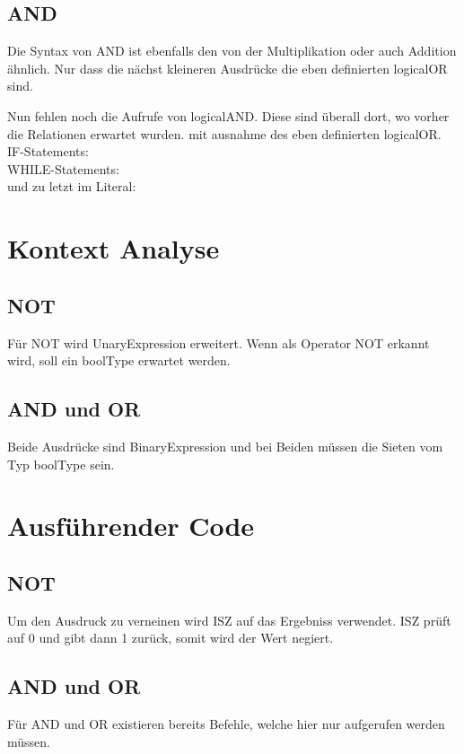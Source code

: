 \subsection{AND}
Die Syntax von AND ist ebenfalls den von der Multiplikation oder auch Addition ähnlich. 
Nur dass die nächst kleineren Ausdrücke die eben definierten logicalOR sind.

Nun fehlen noch die Aufrufe von logicalAND. Diese sind überall dort, wo vorher die Relationen erwartet wurden. mit ausnahme des eben definierten logicalOR.
IF-Statements:\\

WHILE-Statements:\\

und zu letzt im Literal:


\section{Kontext Analyse}
\subsection{NOT}
Für NOT wird UnaryExpression erweitert.
Wenn als Operator NOT erkannt wird, soll ein boolType erwartet werden.

\subsection{AND und OR}
Beide Ausdrücke sind BinaryExpression und bei Beiden müssen die Sieten vom Typ boolType sein.




\section{Ausführender Code}
\subsection{NOT}
Um den Ausdruck zu verneinen wird ISZ auf das Ergebniss verwendet.
ISZ prüft auf 0 und gibt dann 1 zurück, somit wird der Wert negiert.

\subsection{AND und OR}
Für AND und OR existieren bereits Befehle, welche hier nur aufgerufen werden müssen.
